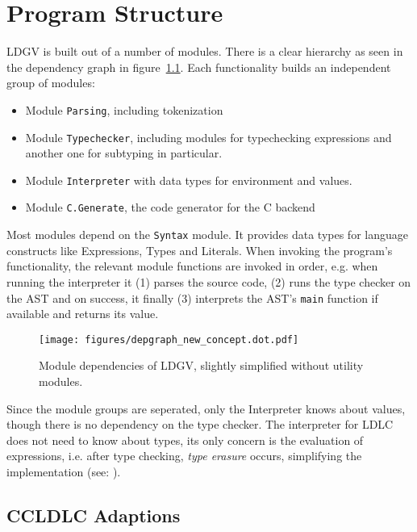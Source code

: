 \chapter{Program Structure}\label{chap:Program Structure}

LDGV is built out of a number of modules. There is a clear hierarchy as seen in the dependency graph in figure~\ref{fig:dependency-graph}. Each functionality builds an independent group of modules:

\begin{itemize}
 \item Module \texttt{Parsing}, including tokenization
 \item Module \texttt{Typechecker}, including modules for typechecking expressions and another one for subtyping in particular.
 \item Module \texttt{Interpreter} with data types for environment and values.
 \item Module \texttt{C.Generate}, the code generator for the C backend
\end{itemize}

Most modules depend on the \texttt{Syntax} module. It provides data types for language constructs like Expressions, Types and Literals. When invoking the program's functionality, the relevant module functions are invoked in order, e.g. when running the interpreter it (1) parses the source code, (2) runs the type checker on the AST and on success, it finally (3) interprets the AST's \texttt{main} function if available and returns its value.

\begin{figure}
 \centering
 \texttt{[image: figures/depgraph\_new\_concept.dot.pdf]}
 \caption{Module dependencies of LDGV, slightly simplified without utility modules.}
 \label{fig:dependency-graph}
\end{figure}

Since the module groups are seperated, only the Interpreter knows about values, though there is no dependency on the type checker. The interpreter for LDLC does not need to know about types, its only concern is the evaluation of expressions, i.e. after type checking, \emph{type erasure} occurs, simplifying the implementation (see: \cite{crary2002}).

\section{CCLDLC Adaptions}

